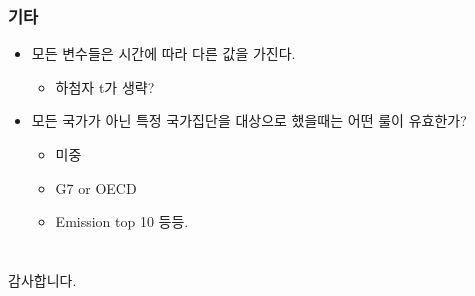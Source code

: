 \documentclass[aspectratio=169,xcolor=dvipsnames,handout]{beamer}
\begin{document}
\begin{frame}
    \frametitle{기타}
    \begin{itemize}[<+->]
        \item 모든 변수들은 시간에 따라 다른 값을 가진다.
            \begin{itemize}[<+->]
                \item 하첨자 t가 생략?
            \end{itemize}
        \item 모든 국가가 아닌 특정 국가집단을 대상으로 했을때는 어떤 룰이 유효한가?
            \begin{itemize}[<+->]
                \item 미중 
                \item G7 or OECD
                \item Emission top 10 등등.
            \end{itemize}

    \end{itemize}
\end{frame}


\section*{}%
\begin{frame}
    \centering
    \huge
    감사합니다.
\end{frame}

\end{document}
